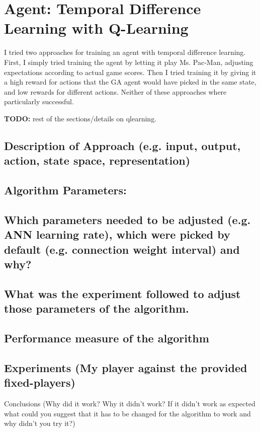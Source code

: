 \section{Agent: Temporal Difference Learning with Q-Learning}
\label{sec:qlearning}
I tried two approaches for training an agent with temporal difference learning.
First, I simply tried training the agent by letting it play Ms. Pac-Man,
adjusting expectations according to actual game scores. Then I tried training it
by giving it a high reward for actions that the GA agent would have picked in the
same state, and low rewards for different actions. Neither of these approaches
where particularly successful.


\textbf{TODO:} rest of the sections/details on qlearning.
\subsection{Description of Approach (e.g. input, output, action, state space,
representation)}

\subsection{Algorithm Parameters:}

\subsection{Which parameters needed to be adjusted (e.g. ANN learning rate),
which were picked by default (e.g. connection weight interval) and why?}

\subsection{What was the experiment followed to adjust those parameters of the
algorithm.}

\subsection{Performance measure of the algorithm}

\subsection{Experiments (My player against the provided ﬁxed-players)}
Conclusions (Why did it work? Why it didn't work? If it didn't work as expected what could you suggest that it has to be changed for the algorithm to work and why didn't you try it?)

